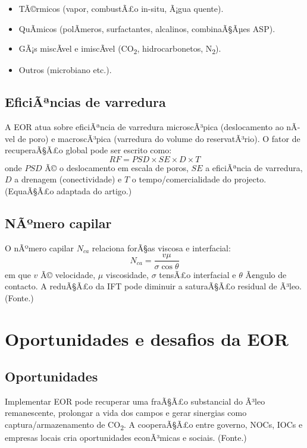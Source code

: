 \documentclass[11pt,a4paper]{article}
\begin{document}
\begin{itemize}[noitemsep]
	\item TÃ©rmicos (vapor, combustÃ£o in-situ, Ã¡gua quente).
	\item QuÃ­micos (polÃ­meros, surfactantes, alcalinos, combinaÃ§Ãµes ASP).
	\item GÃ¡s miscÃ­vel e imiscÃ­vel (CO\textsubscript{2}, hidrocarbonetos, N\textsubscript{2}).
	\item Outros (microbiano etc.).
\end{itemize}

\subsection{EficiÃªncias de varredura}
A EOR atua sobre eficiÃªncia de varredura microscÃ³pica (deslocamento ao nÃ­vel de poro) e macroscÃ³pica (varredura do volume do reservatÃ³rio). O fator de recuperaÃ§Ã£o global pode ser escrito como:
\begin{equation}
RF = PSD \times SE \times D \times T
\end{equation}
onde $PSD$ Ã© o deslocamento em escala de poros, $SE$ a eficiÃªncia de varredura, $D$ a drenagem (conectividade) e $T$ o tempo/comercialidade do projecto. (EquaÃ§Ã£o adaptada do artigo.)

\subsection{NÃºmero capilar}
O nÃºmero capilar $N_{ca}$ relaciona forÃ§as viscosa e interfacial:
\begin{equation}
N_{ca} = \frac{v \mu}{\sigma \cos\theta}
\end{equation}
em que $v$ Ã© velocidade, $\mu$ viscosidade, $\sigma$ tensÃ£o interfacial e $\theta$ Ã¢ngulo de contacto. A reduÃ§Ã£o da IFT pode diminuir a saturaÃ§Ã£o residual de Ã³leo. (Fonte.)

\section{Oportunidades e desafios da EOR}
\subsection{Oportunidades}
Implementar EOR pode recuperar uma fraÃ§Ã£o substancial do Ã³leo remanescente, prolongar a vida dos campos e gerar sinergias como captura/armazenamento de CO\textsubscript{2}. A cooperaÃ§Ã£o entre governo, NOCs, IOCs e empresas locais cria oportunidades econÃ³micas e sociais. (Fonte.)
\end{document}
